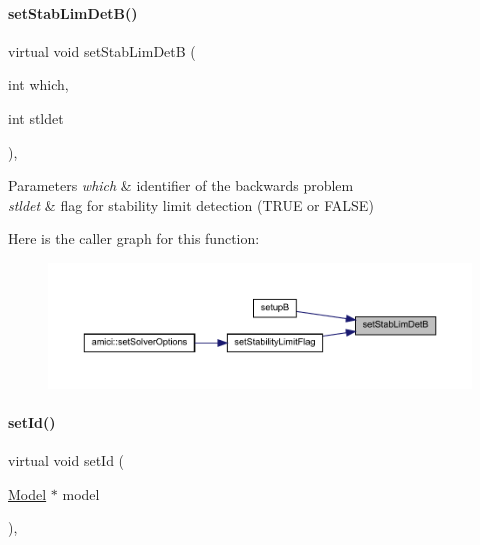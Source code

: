 \paragraph{\texorpdfstring{setStabLimDetB()}{setStabLimDetB()}}
{\footnotesize\ttfamily virtual void set\+Stab\+Lim\+DetB (\begin{DoxyParamCaption}\item[{int}]{which,  }\item[{int}]{stldet }\end{DoxyParamCaption})\hspace{0.3cm}{\ttfamily [protected]}, {}}


\begin{DoxyParams}{Parameters}
{\em which} & identifier of the backwards problem \\
\hline
{\em stldet} & flag for stability limit detection (T\+R\+UE or F\+A\+L\+SE) \\
\hline
\end{DoxyParams}
Here is the caller graph for this function\+:
\nopagebreak
\begin{figure}[H]
\begin{center}
\leavevmode
\includegraphics[width=350pt]{classamici_1_1_solver_acb7f8ad7671faf5fa7e5fa7851e662ec_icgraph}
\end{center}
\end{figure}
\mbox{\label{classamici_1_1_solver_a5c1ec0904b36a63c3d8adc74ffbb3718}} 
\paragraph{\texorpdfstring{setId()}{setId()}}
{\footnotesize\ttfamily virtual void set\+Id (\begin{DoxyParamCaption}\item[{\mbox{\hyperlink{classamici_1_1_model}{Model}} $\ast$}]{model }\end{DoxyParamCaption})\hspace{0.3cm}{\ttfamily [protected]}, {}}


